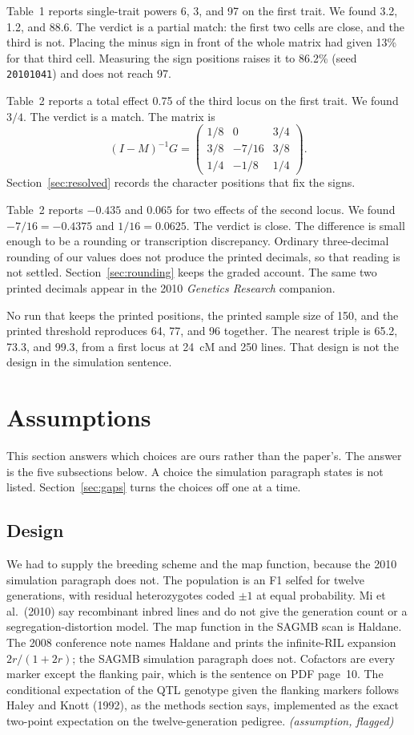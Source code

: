 \documentclass[11pt]{article}
\newcommand{\ev}[1]{\textup{\emph{(#1)}}}
\begin{document}
Table~1 reports single-trait powers 6, 3, and 97 on the first trait. We
found 3.2, 1.2, and 88.6. The verdict is a partial match: the first two
cells are close, and the third is not. Placing the minus sign in front of
the whole matrix had given 13\% for that third cell. Measuring the sign
positions raises it to 86.2\% (seed \texttt{20101041}) and does not reach 97.

Table~2 reports a total effect 0.75 of the third locus on the first trait.
We found $3/4$. The verdict is a match. The matrix is
\[
(I-M)^{-1}G
=\begin{pmatrix}1/8&0&3/4\\ 3/8&-7/16&3/8\\ 1/4&-1/8&1/4\end{pmatrix}.
\]
Section~\ref{sec:resolved} records the character positions that fix the signs.

Table~2 reports $-0.435$ and $0.065$ for two effects of the second locus.
We found $-7/16=-0.4375$ and $1/16=0.0625$. The verdict is close. The
difference is small enough to be a rounding or transcription discrepancy.
Ordinary three-decimal rounding of our values does not produce the printed
decimals, so that reading is not settled. Section~\ref{sec:rounding} keeps
the graded account. The same two printed decimals appear in the 2010
\emph{Genetics Research} companion.

No run that keeps the printed positions, the printed sample size of 150, and
the printed threshold reproduces 64, 77, and 96 together. The nearest triple
is 65.2, 73.3, and 99.3, from a first locus at 24~cM and 250 lines. That
design is not the design in the simulation sentence.

\section{Assumptions}
\label{sec:assumptions}

This section answers which choices are ours rather than the paper's. The
answer is the five subsections below. A choice the simulation paragraph
states is not listed. Section~\ref{sec:gaps} turns the choices off one at a
time.

\subsection{Design}

We had to supply the breeding scheme and the map function, because the 2010
simulation paragraph does not. The population is an F1 selfed for twelve
generations, with residual
heterozygotes coded $\pm 1$ at equal probability. Mi et al.\ (2010) say
recombinant inbred lines and do not give the generation count or a
segregation-distortion model. The map function in the SAGMB scan is Haldane.
The 2008 conference note names Haldane and prints the infinite-RIL expansion
$2r/(1+2r)$; the SAGMB simulation paragraph does not. Cofactors are every
marker except the flanking pair, which is the sentence on PDF page~10.
The conditional expectation of the QTL genotype given the flanking markers
follows Haley and Knott (1992), as the methods section says, implemented as
the exact two-point expectation on the twelve-generation pedigree.
\ev{assumption, flagged}
\end{document}
